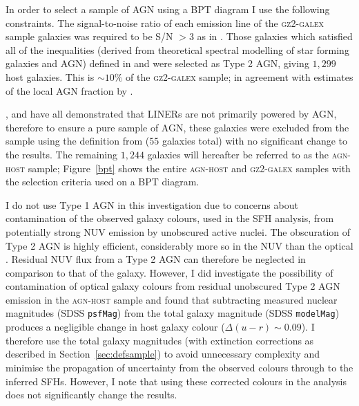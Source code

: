 In order to select a sample of AGN using a BPT diagram I use the following constraints. The signal-to-noise ratio of each emission line of the \textsc{gz2-galex} sample galaxies was required to be S/N $> 3$ as in \cite{schawinski10a}. Those galaxies which satisfied all of the inequalities (derived from theoretical spectral modelling of star forming galaxies and AGN) defined in \citet[][to separate SF galaxies from AGN]{kewley01} and \citet[][to separate SF galaxies from composite SF-AGN galaxies]{kauffmann03b} were selected as Type 2 AGN, giving $1,299$ host galaxies. This is $\sim10\%$ of the \textsc{gz2-galex} sample; in agreement with estimates of the local AGN fraction by \citealt{kauffmann04, pimbblet13}.

\cite{Sarzi10}, \cite{yan12} and \cite{Singh13} have all demonstrated that LINERs are not primarily powered by AGN, therefore to ensure a pure sample of AGN, these galaxies were excluded from the sample using the definition from \citet[][]{kewley06} ($55$ galaxies total) with no significant change to the results. The remaining $1,244$ galaxies will hereafter be referred to as the \textsc{agn-host} sample; Figure~\ref{bpt} shows the entire \textsc{agn-host} and \textsc{gz2-galex} samples with the selection criteria used on a BPT diagram.

I do not use Type 1 AGN in this investigation due to concerns about contamination of the observed galaxy colours, used in the SFH analysis, from potentially strong NUV emission by unobscured active nuclei. The obscuration of Type 2 AGN is highly efficient, considerably more so in the NUV than the optical \citep{Simmons11}. Residual NUV flux from a Type 2 AGN can therefore be neglected in comparison to that of the galaxy. However, I did investigate the possibility of contamination of optical galaxy colours from residual unobscured Type 2 AGN emission in the \textsc{agn-host} sample and found that subtracting measured nuclear magnitudes (SDSS {\tt psfMag}) from the total galaxy magnitude (SDSS {\tt modelMag}) produces a negligible change in host galaxy colour ($\Delta(u-r) \sim 0.09$). I therefore use the total galaxy magnitudes (with extinction corrections as described in Section~\ref{sec:defsample}) to avoid unnecessary complexity and minimise the propagation of uncertainty from the observed colours through to the inferred SFHs. However, I note that using these corrected colours in the analysis does not significantly change the results.

